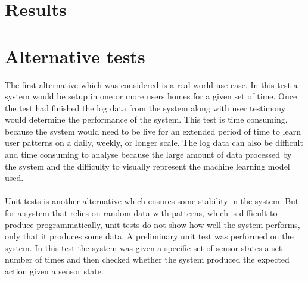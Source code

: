 \section{Results}


\section{Alternative tests}
The first alternative which was considered is a real world use case. In this test a system would be setup in one or more users homes for a given set of time. Once the test had finished the log data from the system along with user testimony would determine the performance of the system. This test is time consuming, because the system would need to be live for an extended period of time to learn user patterns on a daily, weekly, or longer scale. The log data can also be difficult and time consuming to analyse because the large amount of data processed by the system and the difficulty to visually represent the machine learning model used.
\\\\
Unit tests is another alternative which ensures some stability in the system. But for a system that relies on random data with patterns, which is difficult to produce programmatically, unit tests do not show how well the system performs, only that it produces some data. A preliminary unit test was performed on the system. In this test the system was given a specific set of sensor states a set number of times and then checked whether the system produced the expected action given a sensor state.
